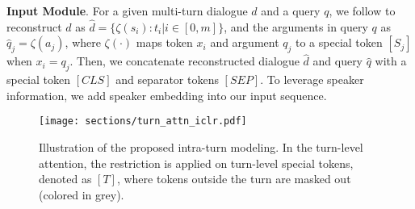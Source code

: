 \textbf{Input Module}. For a given multi-turn dialogue $d$ and a query $q$, we follow \cite{yu-etal-2020-dialogue} to reconstruct $d$ as $\hat d=\{\zeta(s_i):t_i|i\in[0,m]\}$, and the arguments in query $q$ as $\hat q_j=\zeta(a_j)$, where
$\zeta(\cdot)$ maps token $x_i$ and argument $q_j$ to a special token $[S_j]$ when $x_i=q_j$. Then, we concatenate reconstructed dialogue $\hat d$ and query $\hat q$ with a special token $[CLS]$ and separator tokens $[SEP]$. To leverage speaker information, we add speaker embedding \citep{gu2020speaker} into our input sequence.
\begin{figure}[t]
\centering
\vspace{-0.4cm}
\texttt{[image: sections/turn\_attn\_iclr.pdf]}
\caption{Illustration of the proposed intra-turn modeling. In the turn-level attention, the restriction is applied on turn-level special tokens, denoted as $[T]$, where tokens outside the turn are masked out (colored in grey). }
\vspace{-0.4cm}
\label{fig:TurnAttn}
\end{figure}

